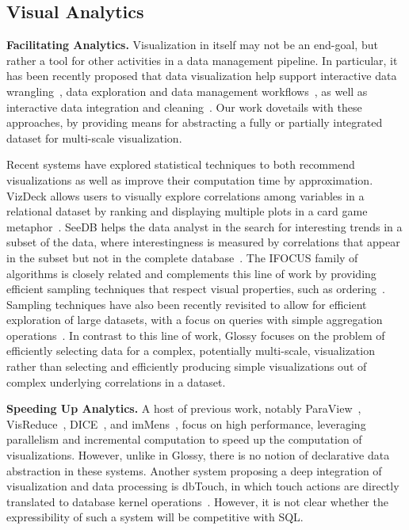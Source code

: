 \documentclass[11pt, oneside]{report}
\newcommand{\minisec}[1]{\noindent\textbf{#1.}}
\begin{document}
\subsection{Visual Analytics}
\label{sec:related:analytics}

\minisec{Facilitating Analytics}
Visualization in itself may not be an end-goal, but rather a tool for other activities in a data management pipeline. In particular, it has been recently proposed that data visualization help support interactive data wrangling~\cite{KandelPHH11:Wrangler}, data exploration and data management workflows~\cite{BavoilCSVCSF05:VisTrails,FeketeS12:DMVisChallenges}, as well as interactive data integration and cleaning~\cite{MortonBGM14:VisClean}. Our work dovetails with these approaches, by providing means for abstracting a fully or partially integrated dataset for multi-scale visualization.    

Recent systems have explored statistical techniques to both recommend visualizations as well as improve their computation time by approximation. VizDeck allows users to visually explore correlations among variables in a relational dataset by ranking and displaying multiple plots in a card game metaphor~\cite{KeyHPA12:VizDeck}. SeeDB helps the data analyst in the search for interesting trends in a subset of the data, where interestingness is measured by correlations that appear in the subset but not in the complete database~\cite{vartak:seedb}. The IFOCUS family of algorithms is closely related and complements this line of work by providing efficient sampling techniques that respect visual properties, such as ordering~\cite{blais:generating}. Sampling techniques have also been recently revisited to allow for efficient exploration of large datasets, with a focus on queries with simple aggregation operations~\cite{Agarwal:2014:blink,NirkhiwaleDJ13:sampling,SidirourgosKB11:SciBORQ}.  In contrast to this line of work, Glossy focuses on the problem of efficiently selecting data for a complex, potentially multi-scale, visualization rather than selecting and efficiently producing simple visualizations out of complex underlying correlations in a dataset. 

\minisec{Speeding Up Analytics}
A host of previous work, notably ParaView~\cite{HendersonAL04:ParaView}, VisReduce~\cite{ImVM13:VisReduce}, DICE~\cite{KamatJTN14:CubeExploration}, and imMens~\cite{LiuJH13:imMens}, focus on high performance, leveraging parallelism and incremental computation to speed up the computation of visualizations. However, unlike in Glossy, there is no notion of declarative data abstraction in these systems. Another system proposing a deep integration of visualization and data processing is dbTouch, in which touch actions are directly translated to database kernel operations~\cite{IdreosL13:dbTouch}. However, it is not clear whether the expressibility of such a system will be competitive with SQL.\newline
\end{document}
